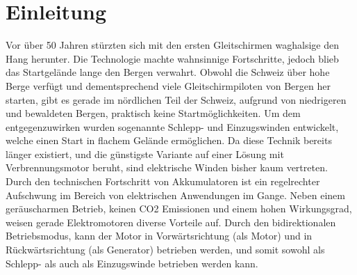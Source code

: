 \section{Einleitung}
Vor über 50 Jahren stürzten sich mit den ersten Gleitschirmen waghalsige den Hang herunter. Die Technologie machte wahnsinnige Fortschritte, jedoch blieb das Startgelände lange den Bergen verwahrt. Obwohl die Schweiz über hohe Berge verfügt und dementsprechend viele Gleitschirmpiloten von Bergen her starten, gibt es gerade im nördlichen Teil der Schweiz, aufgrund von niedrigeren und bewaldeten Bergen, praktisch keine Startmöglichkeiten. Um dem entgegenzuwirken wurden sogenannte Schlepp- und Einzugswinden entwickelt, welche einen Start in flachem Gelände ermöglichen. Da diese Technik bereits länger existiert, und die günstigste Variante auf einer Lösung mit Verbrennungsmotor beruht, sind elektrische Winden bisher kaum vertreten. Durch den technischen Fortschritt von Akkumulatoren ist ein regelrechter Aufschwung im Bereich von elektrischen Anwendungen im Gange. Neben einem geräuscharmen Betrieb, keinen CO2 Emissionen und einem hohen Wirkungsgrad, weisen gerade Elektromotoren diverse Vorteile auf. Durch den bidirektionalen Betriebsmodus, kann der Motor in Vorwärtsrichtung (als Motor) und in Rückwärtsrichtung (als Generator) betrieben werden, und somit sowohl als Schlepp- als auch als Einzugswinde betrieben werden kann.
